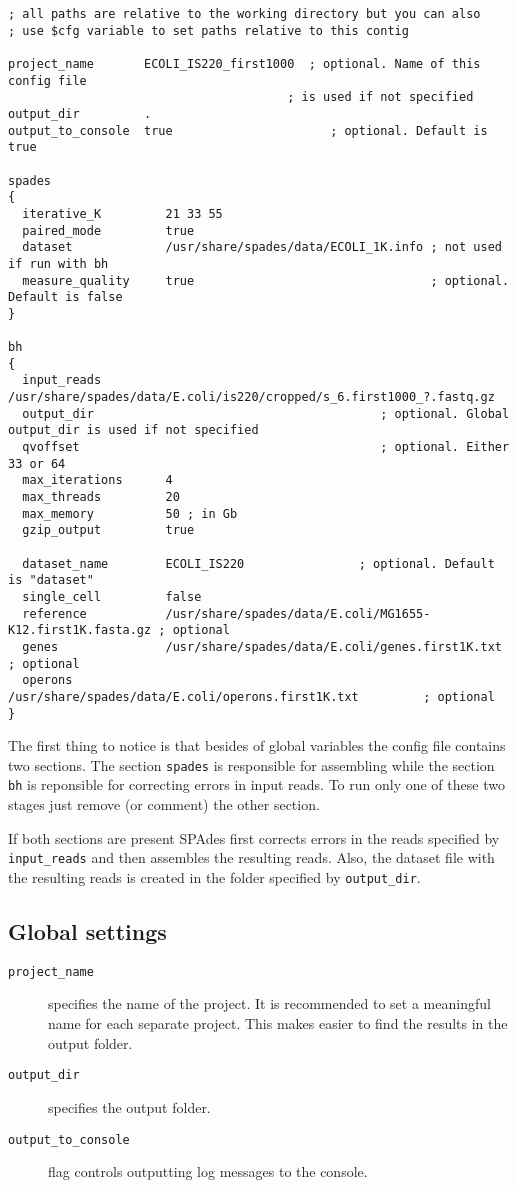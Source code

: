 \documentclass{article}
\def\spades{SPAdes}
\begin{document}
\begin{lstlisting}													
; all paths are relative to the working directory but you can also 
; use $cfg variable to set paths relative to this contig

project_name       ECOLI_IS220_first1000  ; optional. Name of this config file 
                                       ; is used if not specified
output_dir         .
output_to_console  true                      ; optional. Default is true

spades
{
  iterative_K         21 33 55
  paired_mode         true
  dataset             /usr/share/spades/data/ECOLI_1K.info ; not used if run with bh
  measure_quality     true                                 ; optional. Default is false
}

bh
{
  input_reads         /usr/share/spades/data/E.coli/is220/cropped/s_6.first1000_?.fastq.gz
  output_dir                                        ; optional. Global output_dir is used if not specified
  qvoffset                                          ; optional. Either 33 or 64
  max_iterations      4
  max_threads         20
  max_memory          50 ; in Gb
  gzip_output         true

  dataset_name        ECOLI_IS220                ; optional. Default is "dataset"
  single_cell         false
  reference           /usr/share/spades/data/E.coli/MG1655-K12.first1K.fasta.gz ; optional
  genes               /usr/share/spades/data/E.coli/genes.first1K.txt           ; optional
  operons             /usr/share/spades/data/E.coli/operons.first1K.txt         ; optional
}
\end{lstlisting}

The first thing to notice is that besides of global variables the config file contains two sections. The section {\tt spades} is responsible for assembling
while the section {\tt bh} is reponsible for correcting errors in input reads.
To run only one of these two stages just remove (or comment) the other section.

If both sections are present {\spades} first corrects errors in the reads specified by {\tt input\_reads} and then assembles the resulting reads. Also, the dataset file
with the resulting reads is created in the folder specified by {\tt output\_dir}.

\subsection{Global settings}

\begin{description}
\item[{\tt project\_name}] specifies the name of the project. It is recommended to set a meaningful name for each separate project. This makes easier to find the results in the output folder.
\item[{\tt output\_dir}] specifies the output folder.
\item[{\tt output\_to\_console}] flag controls outputting log messages to the console.
\end{description}
\end{document}
